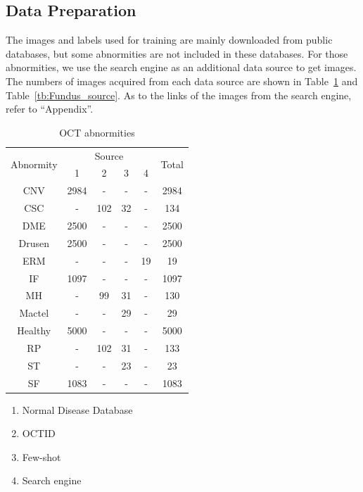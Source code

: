\documentclass{article}
\begin{document}
	\subsection{Data Preparation}
	
	The images and labels used for training are mainly downloaded from public databases, but some abnormities are not included in these databases. For those abnormities, we use the search engine as an additional data source to get images. The numbers of images acquired from each data source are shown in Table~\ref{tb:OCT_source} and Table~\ref{tb:Fundus_source}. As to the links of the images from the search engine, refer to ``Appendix''. 
	
	\begin{minipage}[t]{0.4\linewidth}
		{
			\fontsize{9}{12}\selectfont
			{
				\begin{longtable}{cccccc}
					\caption{OCT abnormities}
					\label{tb:OCT_source}\\
					\toprule
					\multirow{2}{*}{Abnormity}&\multicolumn{4}{c}{Source}&\multirow{2}{*}{Total}\\
					&1&2&3&4&\\
					\midrule
					CNV    &2984&-  &- &- &2984\\
					CSC    &-   &102&32&- &134 \\
					DME    &2500&-  &- &- &2500\\
					Drusen &2500&-  &- &- &2500\\
					ERM    &-   &-  &- &19&19  \\
					IF     &1097&-  &- &- &1097\\
					MH     &-   &99 &31&- &130 \\
					Mactel &-   &-  &29&- &29  \\
					Healthy&5000&-  &- &- &5000\\
					RP     &-   &102&31&- &133 \\
					ST     &-   &-  &23&- &23  \\
					SF     &1083&-  &- &- &1083\\
					\bottomrule
				\end{longtable}
				
				\vspace{0.5cm}
				\begin{enumerate}
					\item Normal Disease Database \autocite{Kermany_database}
					\vspace{-0.2cm}
					
					\item OCTID \autocite{Gholami_Roy_Parthasarathy_Lakshminarayanan_2020}
					\vspace{-0.2cm}
					
					\item Few-shot \autocite{Yoo_2020}
					\vspace{-0.2cm}
					
					\item Search engine
					\vspace{-0.2cm}
				\end{enumerate}
				
				\vspace{0.5cm}
			}
		}
	\end{minipage}
\end{document}

